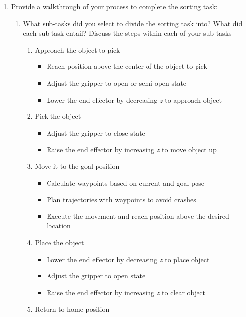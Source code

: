 \documentclass[12pt]{article}
\begin{document}
\begin{enumerate}

    \item Provide a walkthrough of your process to complete the sorting task:
    
    \begin{enumerate}

        \item What sub-tasks did you select to divide the sorting task into? What did each sub-task entail?	Discuss the steps within each of your sub-tasks
        
        \begin{enumerate}
            \item Approach the object to pick
            \begin{itemize}
                \item Reach position above the center of the object to pick
                \item Adjust the gripper to open or semi-open state
                \item Lower the end effector by decreasing \textit{z} to approach object
            \end{itemize}
            \item Pick the object
            \begin{itemize}
                \item Adjust the gripper to close state
                \item Raise the end effector by increasing \textit{z} to move object up
            \end{itemize}
            \item Move it to the goal position
            \begin{itemize}
                \item Calculate waypoints based on current and goal pose
                \item Plan trajectories with waypoints to avoid crashes
                \item Execute the movement and reach position above the desired location
            \end{itemize}
            \item Place the object
            \begin{itemize}
                \item Lower the end effector by decreasing \textit{z} to place object
                \item Adjust the gripper to open state
                \item Raise the end effector by increasing \textit{z} to clear object
            \end{itemize}
            \item Return to home position
        \end{enumerate}
        

\end{enumerate}
\end{enumerate}
\end{document}
